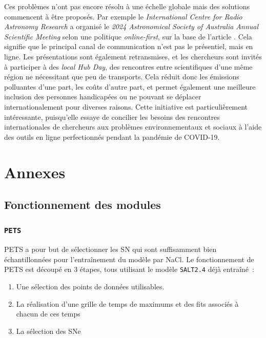 \documentclass{book}
\def\pets{\texttt{PETS}\xspace}
\def\saltd{\texttt{SALT2.4}\xspace}
\begin{document}
Ces problèmes n'ont pas encore résolu à une échelle globale mais des solutions commencent à être proposés. Par exemple le \textit{International Centre for Radio Astronomy Research} a organisé le \textit{2024 Astronomical Society of Australia Annual Scientific Meeting} selon une politique \textit{online-first}, sur la base de l'article \cite{sarabipour_changing_2021}. Cela signifie que le principal canal de communication n'est pas le présentiel, mais en ligne. Les présentations sont également retransmises, et les chercheurs sont invités à participer à des \textit{local Hub Day}, des rencontres entre scientifiques d'une même région ne nécessitant que peu de transports. Cela réduit donc les émissions polluantes d'une part, les coûts d'autre part, et permet également une meilleure inclusion des personnes handicapées ou ne pouvant se déplacer internationalement pour diverses raisons. Cette initiative est particulièrement intéressante, puisqu'elle essaye de concilier les besoins des rencontres internationales de chercheurs aux problèmes environnementaux et sociaux à l'aide des outils en ligne perfectionnés pendant la pandémie de COVID-19.



\appendix
\chapter{Annexes}

\section{Fonctionnement des modules}

\subsection{\pets}
\label{anx:pets}

PETS a pour but de sélectionner les SN qui sont suffisamment bien échantillonnées pour l'entraînement du modèle par NaCl.
Le fonctionnement de PETS est découpé en 3 étapes, tous utilisant le modèle \saltd déjà entraîné~:
\begin{enumerate}
\item Une sélection des points de données utilisables.
\item La réalisation d'une grille de temps de maximums et des fits associés à chacun de ces temps
\item La sélection des SNe
\end{enumerate}
\end{document}
